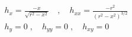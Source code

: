 %  
\begin{gather*}
h_x = \frac{-x}{\sqrt{r^2 - x^2}}
\quad , \quad
h_{xx} = \frac{-r^2}{\left(r^2 - x^2\right)^{3/2}}\\
h_y = 0
\; , \quad
h_{yy} = 0 \;,\quad h_{xy} = 0
\end{gather*}


